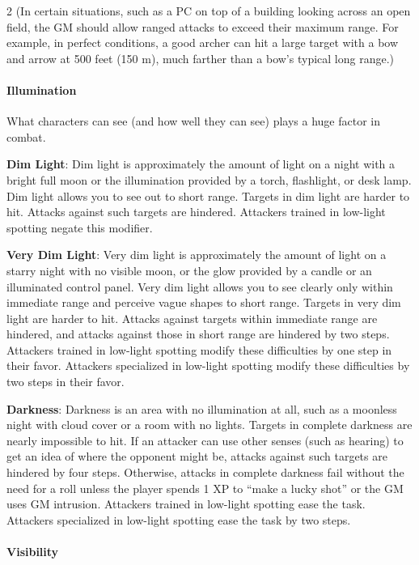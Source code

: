 \begin{multicols}{2}
(In certain situations, such as a PC on top of a building looking across an open field, the GM should allow ranged attacks to exceed their maximum range. For example, in perfect conditions, a good archer can hit a large target with a bow and arrow at 500 feet (150 m), much farther than a bow’s typical long range.)

\paragraph{Illumination}

What characters can see (and how well they can see) plays a huge factor in combat.

\textbf{Dim Light}: Dim light is approximately the amount of light on a night with a bright full moon or the illumination provided by a torch, flashlight, or desk lamp. Dim light allows you to see out to short range. Targets in dim light are harder to hit. Attacks against such targets are hindered. Attackers trained in low-light spotting negate this modifier.

\textbf{Very Dim Light}: Very dim light is approximately the amount of light on a starry night with no visible moon, or the glow provided by a candle or an illuminated control panel. Very dim light allows you to see clearly only within immediate range and perceive vague shapes to short range. Targets in very dim light are harder to hit. Attacks against targets within immediate range are hindered, and attacks against those in short range are hindered by two steps. Attackers trained in low-light spotting modify these difficulties by one step in their favor. Attackers specialized in low-light spotting modify these difficulties by two steps in their favor.

\textbf{Darkness}: Darkness is an area with no illumination at all, such as a moonless night with cloud cover or a room with no lights. Targets in complete darkness are nearly impossible to hit. If an attacker can use other senses (such as hearing) to get an idea of where the opponent might be, attacks against such targets are hindered by four steps. Otherwise, attacks in complete darkness fail without the need for a roll unless the player spends 1 XP to “make a lucky shot” or the GM uses GM intrusion. Attackers trained in low-light spotting ease the task. Attackers specialized in low-light spotting ease the task by two steps.

\paragraph{Visibility}


\end{multicols}
